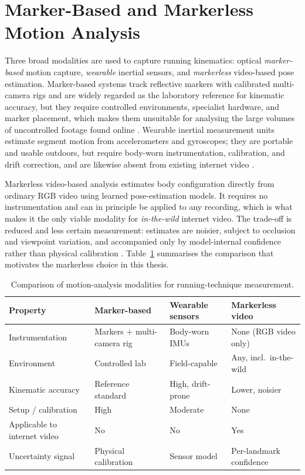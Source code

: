 \section{Marker-Based and Markerless Motion Analysis}
\label{sec:lit-modalities}

Three broad modalities are used to capture running kinematics:
optical \emph{marker-based} motion capture, \emph{wearable} inertial sensors,
and \emph{markerless} video-based pose estimation. Marker-based systems track
reflective markers with calibrated multi-camera rigs and are widely regarded as
the laboratory reference for kinematic accuracy, but they require controlled
environments, specialist hardware, and marker placement, which makes them
unsuitable for analysing the large volumes of uncontrolled footage found online
\cite{panconi2024markerless}. Wearable inertial measurement units estimate
segment motion from accelerometers and gyroscopes; they are portable and usable
outdoors, but require body-worn instrumentation, calibration, and drift
correction, and are likewise absent from existing internet video
\cite{fiaz2026gaitphase, bulling2014tutorial}.

Markerless video-based analysis estimates body configuration directly from
ordinary RGB video using learned pose-estimation models. It requires no
instrumentation and can in principle be applied to any recording, which is what
makes it the only viable modality for \emph{in-the-wild} internet video. The
trade-off is reduced and less certain measurement: estimates are noisier,
subject to occlusion and viewpoint variation, and accompanied only by
model-internal confidence rather than physical calibration
\cite{lugaresi2019mediapipe, bazarevsky2020blazepose, topham2023hpesurvey}.
Table~\ref{tab:modalities} summarises the comparison that motivates the
markerless choice in this thesis.

\begin{table}[htbp]
\centering
\caption{Comparison of motion-analysis modalities for running-technique
measurement.}
\label{tab:modalities}
\renewcommand{\arraystretch}{1.2}
\begin{tabularx}{\textwidth}{l X X X}
\toprule
Property & Marker-based & Wearable sensors & Markerless video \\
\midrule
Instrumentation & Markers $+$ multi-camera rig & Body-worn IMUs & None (RGB video only) \\
Environment & Controlled lab & Field-capable & Any, incl.\ in-the-wild \\
Kinematic accuracy & Reference standard & High, drift-prone & Lower, noisier \\
Setup / calibration & High & Moderate & None \\
Applicable to internet video & No & No & Yes \\
Uncertainty signal & Physical calibration & Sensor model & Per-landmark confidence \\
\bottomrule
\end{tabularx}
\end{table}

